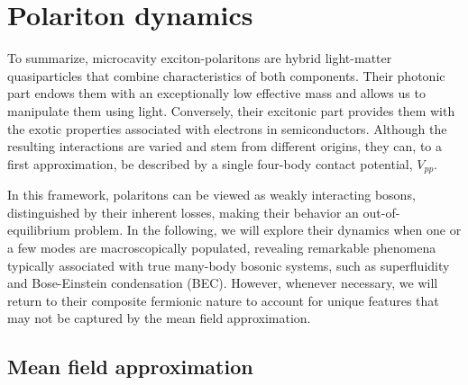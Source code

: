 \section{Polariton dynamics}

\indent 

To summarize, microcavity exciton-polaritons are hybrid light-matter quasiparticles that combine characteristics of both components. 
Their photonic part endows them with an exceptionally low effective mass and allows us to manipulate them using light. 
Conversely, their excitonic part provides them with the exotic properties associated with electrons in semiconductors. 
Although the resulting interactions are varied and stem from different origins, they can, to a first approximation, be described by a single four-body contact potential, $V_{pp}$.

In this framework, polaritons can be viewed as weakly interacting bosons, distinguished by their inherent losses, making their behavior an out-of-equilibrium problem. 
In the following, we will explore their dynamics when one or a few modes are macroscopically populated, revealing remarkable phenomena typically associated with true many-body bosonic systems, such as superfluidity and Bose-Einstein condensation (BEC).
 However, whenever necessary, we will return to their composite fermionic nature to account for unique features that may not be captured by the mean field approximation.
 
\subsection{Mean field approximation}

\indent

